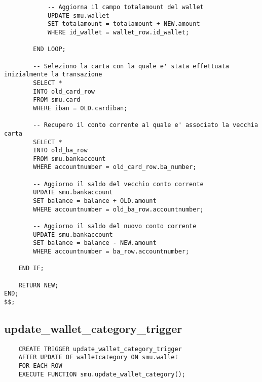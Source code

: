 \begin{lstlisting}
            -- Aggiorna il campo totalamount del wallet
            UPDATE smu.wallet
            SET totalamount = totalamount + NEW.amount
            WHERE id_wallet = wallet_row.id_wallet;

        END LOOP;        

        -- Seleziono la carta con la quale e' stata effettuata inizialmente la transazione
        SELECT *
        INTO old_card_row
        FROM smu.card
        WHERE iban = OLD.cardiban;

        -- Recupero il conto corrente al quale e' associato la vecchia carta
        SELECT *
        INTO old_ba_row
        FROM smu.bankaccount
        WHERE accountnumber = old_card_row.ba_number;

        -- Aggiorno il saldo del vecchio conto corrente
        UPDATE smu.bankaccount
        SET balance = balance + OLD.amount
        WHERE accountnumber = old_ba_row.accountnumber;

        -- Aggiorno il saldo del nuovo conto corrente
        UPDATE smu.bankaccount
        SET balance = balance - NEW.amount
        WHERE accountnumber = ba_row.accountnumber;

    END IF;

    RETURN NEW;
END;
$$;
\end{lstlisting}

\newpage

\subsection{update\_wallet\_category\_trigger}

\begin{lstlisting}
    CREATE TRIGGER update_wallet_category_trigger 
    AFTER UPDATE OF walletcategory ON smu.wallet 
    FOR EACH ROW 
    EXECUTE FUNCTION smu.update_wallet_category();
\end{lstlisting}

